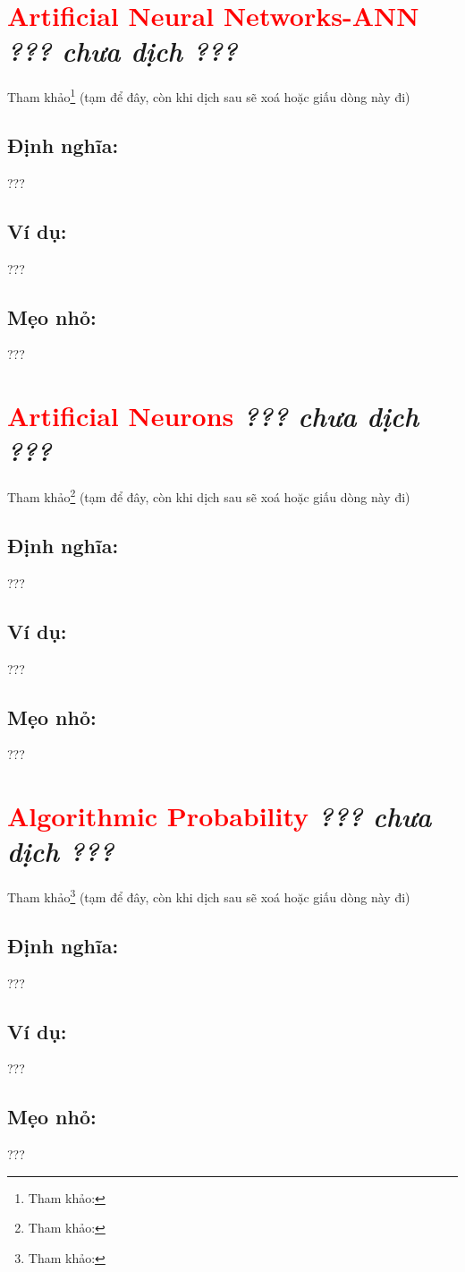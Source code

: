 \section*{\huge \textcolor{Red}{Artificial Neural Networks-ANN}  \small \textit{??? chưa dịch ???} }
Tham khảo\footnote{Tham khảo:} (tạm để đây, còn khi dịch sau sẽ xoá hoặc giấu dòng này đi)
\subsection*{Định nghĩa:}
???
\subsection*{Ví dụ:}
???
\subsection*{Mẹo nhỏ:}
???
\section*{\huge \textcolor{Red}{Artificial Neurons}  \small \textit{??? chưa dịch ???} }
Tham khảo\footnote{Tham khảo:} (tạm để đây, còn khi dịch sau sẽ xoá hoặc giấu dòng này đi)
\subsection*{Định nghĩa:}
???
\subsection*{Ví dụ:}
???
\subsection*{Mẹo nhỏ:}
???
\section*{\huge \textcolor{Red}{Algorithmic Probability}  \small \textit{??? chưa dịch ???} }
Tham khảo\footnote{Tham khảo:} (tạm để đây, còn khi dịch sau sẽ xoá hoặc giấu dòng này đi)
\subsection*{Định nghĩa:}
???
\subsection*{Ví dụ:}
???
\subsection*{Mẹo nhỏ:}
???
